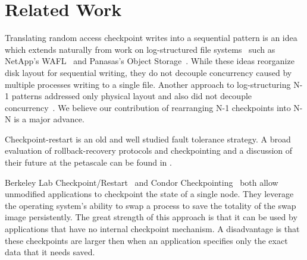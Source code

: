 \section{Related Work}
\label{related}




Translating random access checkpoint writes into a sequential pattern is an
idea which extends naturally from work on log-structured file
systems~\cite{lfs} such as NetApp's WAFL~\cite{WAFL} and Panasas's Object
Storage~\cite{welch08scalableperformance}. While these ideas reorganize disk
layout for sequential writing, they do not decouple concurrency caused by
multiple processes writing to a single file.  Another approach to
log-structuring N-1 patterns addressed only physical layout and also did not
decouple concurrency~\cite{pvfs-log}.  We believe our contribution of
rearranging N-1 checkpoints into N-N is a major advance. 

Checkpoint-restart is an old and well studied fault tolerance strategy. A broad
evaluation of rollback-recovery protocols and checkpointing and a discussion of
their future at the petascale can be found in \cite{survey1, survey2}.  

Berkeley Lab Checkpoint/Restart~\cite{blcr} and Condor
Checkpointing~\cite{condor-ckpt} both allow unmodified applications to
checkpoint the state of a single node.  They leverage the operating system's
ability to swap a process to save the totality of the swap image persistently.
The great strength of this approach is that it can be used by applications that
have no internal checkpoint mechanism.  A disadvantage is that these
checkpoints are larger then when an application specifies only the exact data
that it needs saved.


